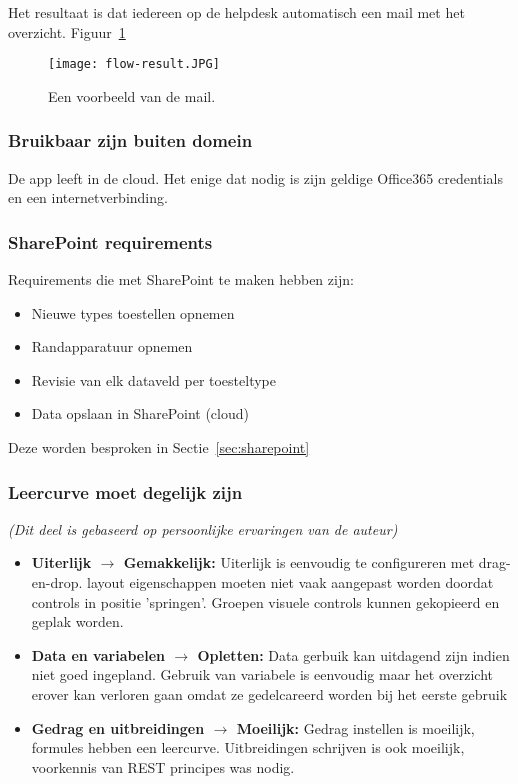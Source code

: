 Het resultaat is dat iedereen op de helpdesk automatisch een mail met het overzicht. Figuur~\ref{fig:flow-result}

\begin{figure}[h!]
    \texttt{[image: flow-result.JPG]}
    \caption{Een voorbeeld van de mail.}
    \label{fig:flow-result}
\end{figure}


\subsubsection{Bruikbaar zijn buiten domein}

De app leeft in de cloud. Het enige dat nodig is zijn geldige Office365 credentials en een internetverbinding.

\subsubsection{SharePoint requirements}

Requirements die met SharePoint te maken hebben zijn:
\begin{itemize}
    \item Nieuwe types toestellen opnemen
    \item Randapparatuur opnemen
    \item Revisie van elk dataveld per toesteltype
    \item Data opslaan in SharePoint (cloud)
\end{itemize}
Deze worden besproken in Sectie~\ref{sec:sharepoint}

\subsubsection{Leercurve moet degelijk zijn}
\textit{(Dit deel is gebaseerd op persoonlijke ervaringen van de auteur)}

\begin{itemize}
    \item \textbf{Uiterlijk $\rightarrow$ Gemakkelijk:} Uiterlijk is eenvoudig te configureren met drag-en-drop. layout eigenschappen moeten niet vaak aangepast worden doordat controls in positie 'springen'. Groepen visuele controls kunnen gekopieerd en geplak worden.
    \item \textbf{Data en variabelen $\rightarrow$ Opletten:} Data gerbuik kan uitdagend zijn indien niet goed ingepland. Gebruik van variabele is eenvoudig maar het overzicht erover kan verloren gaan omdat ze gedelcareerd worden bij het eerste gebruik
    \item \textbf{Gedrag en uitbreidingen $\rightarrow$ Moeilijk:} Gedrag instellen is moeilijk, formules hebben een leercurve. Uitbreidingen schrijven is ook moeilijk, voorkennis van REST principes was nodig.
\end{itemize}

